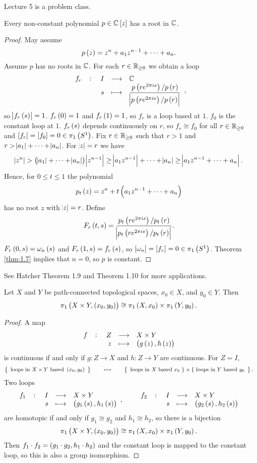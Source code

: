 
Lecture 5 is a problem class.

\pagebreak


\begin{theorem}
Every non-constant polynomial $ p \in \C\sbr{z} $ has a root in $ \mathbb{C} $.
\end{theorem}

\begin{proof}
May assume
$$ p\br{z} = z^n + a_1z^{n - 1} + \dots + a_n. $$
Assume $ p $ has no roots in $ \mathbb{C} $. For each $ r \in \mathbb{R}_{\ge 0} $ we obtain a loop
$$ \function[f_r]{I}{\C}{s}{\dfrac{p\br{re^{2\pi is}} / p\br{r}}{\abs{p\br{re^{2\pi is}} / p\br{r}}}}, $$
so $ \abs{f_r\br{s}} = 1 $. $ f_r\br{0} = 1 $ and $ f_r\br{1} = 1 $, so $ f_r $ is a loop based at $ 1 $. $ f_0 $ is the constant loop at $ 1 $. $ f_r\br{s} $ depends continuously on $ r $, so $ f_r \cong f_0 $ for all $ r \in \mathbb{R}_{\ge 0} $ and $ \sbr{f_r} = \sbr{f_0} = 0 \in \pi_1\br{S^1} $. Fix $ r \in \mathbb{R}_{\ge 0} $ such that $ r > 1 $ and $ r > \abs{a_1} + \dots + \abs{a_n} $. For $ \abs{z} = r $ we have
$$ \abs{z^n} > \br{\abs{a_1} + \dots + \abs{a_n}}\abs{z^{n - 1}} \ge \abs{a_1z^{n - 1}} + \dots + \abs{a_n} \ge \abs{a_1z^{n - 1} + \dots + a_n}. $$
Hence, for $ 0 \le t \le 1 $ the polynomial
$$ p_t\br{z} = z^n + t\br{a_1z^{n - 1} + \dots + a_n} $$
has no root $ z $ with $ \abs{z} = r $. Define
$$ F_r\br{t, s} = \dfrac{p_t\br{re^{2\pi is}} / p_t\br{r}}{\abs{p_t\br{re^{2\pi is}} / p_t\br{r}}}. $$
$ F_r\br{0, s} = \omega_n\br{s} $ and $ F_r\br{1, s} = f_r\br{s} $, so $ \sbr{\omega_n} = \sbr{f_r} = 0 \in \pi_1\br{S^1} $. Theorem \ref{thm:1.7} implies that $ n = 0 $, so $ p $ is constant.
\end{proof}

See Hatcher Theorem 1.9 and Theorem 1.10 for more applications.

\begin{proposition}
Let $ X $ and $ Y $ be path-connected topological spaces, $ x_0 \in X $, and $ y_0 \in Y $. Then
$$ \pi_1\br{X \times Y, \br{x_0, y_0}} \cong \pi_1\br{X, x_0} \times \pi_1\br{Y, y_0}. $$
\end{proposition}

\begin{proof}
A map
$$ \function[f]{Z}{X \times Y}{z}{\br{g\br{z}, h\br{z}}} $$
is continuous if and only if $ g : Z \to X $ and $ h : Z \to Y $ are continuous. For $ Z = I $,
$$ \correspondence{\text{loops in} \ X \times Y \ \text{based} \ \br{x_0, y_0}}{\text{loops in} \ X \ \text{based} \ x_0 \ \} \times \{ \ \text{loops in} \ Y \ \text{based} \ y_0}. $$
Two loops
$$ \function[f_1]{I}{X \times Y}{s}{\br{g_1\br{s}, h_1\br{s}}}, \qquad \function[f_2]{I}{X \times Y}{s}{\br{g_2\br{s}, h_2\br{s}}} $$
are homotopic if and only if $ g_1 \cong g_2 $ and $ h_1 \cong h_2 $, so there is a bijection
$$ \pi_1\br{X \times Y, \br{x_0, y_0}} \cong \pi_1\br{X, x_0} \times \pi_1\br{Y, y_0}. $$
Then $ f_1 \cdot f_2 = \br{g_1 \cdot g_2, h_1 \cdot h_2} $ and the constant loop is mapped to the constant loop, so this is also a group isomorphism.
\end{proof}


